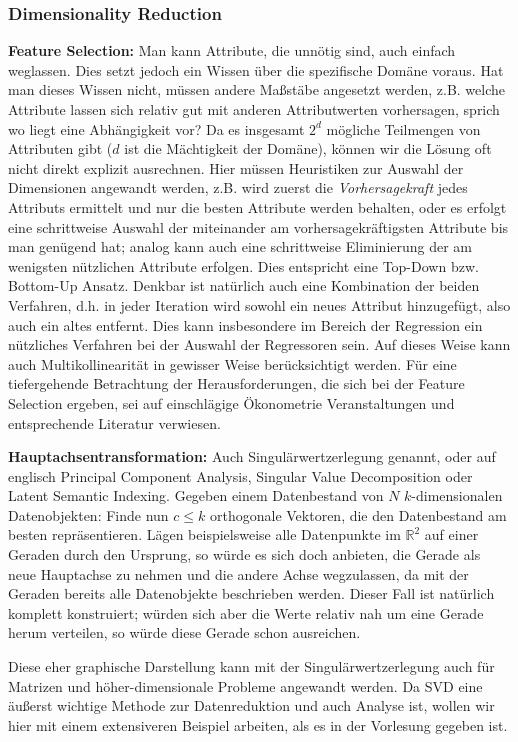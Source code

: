 \subsubsection{Dimensionality Reduction}
\textbf{Feature Selection:} Man kann Attribute, die unnötig sind, auch einfach
weglassen. Dies setzt jedoch ein Wissen über die spezifische Domäne voraus. Hat
man dieses Wissen nicht, müssen andere Maßstäbe angesetzt werden, z.B. welche 
Attribute lassen sich relativ gut mit anderen Attributwerten vorhersagen,
sprich wo liegt eine Abhängigkeit vor? Da es insgesamt \(2^d\) mögliche
Teilmengen von Attributen gibt (\(d\) ist die Mächtigkeit der Domäne), 
können wir die Lösung oft nicht direkt explizit ausrechnen. Hier
müssen Heuristiken zur Auswahl der Dimensionen angewandt werden, z.B. wird zuerst die
\textit{Vorhersagekraft} jedes Attributs ermittelt und nur die besten Attribute
werden behalten, oder es erfolgt eine schrittweise Auswahl der miteinander am vorhersagekräftigsten
Attribute bis man genügend hat; analog kann auch eine schrittweise Eliminierung der am
wenigsten nützlichen Attribute erfolgen. Dies entspricht eine Top-Down bzw.
Bottom-Up Ansatz. Denkbar ist natürlich auch eine Kombination der beiden
Verfahren, d.h. in jeder Iteration wird sowohl ein neues Attribut hinzugefügt,
also auch ein altes entfernt. Dies kann insbesondere im Bereich der Regression
ein nützliches Verfahren bei der Auswahl der Regressoren sein. Auf dieses Weise
kann auch Multikollinearität in gewisser Weise berücksichtigt werden. Für eine
tiefergehende Betrachtung der Herausforderungen, die sich bei der Feature
Selection ergeben, sei auf einschlägige Ökonometrie Veranstaltungen und
entsprechende Literatur verwiesen.

\textbf{Hauptachsentransformation:} Auch Singulärwertzerlegung genannt, oder auf 
englisch Principal Component Analysis, Singular Value Decomposition oder Latent 
Semantic Indexing. Gegeben einem Datenbestand von \(N\) \(k\)-dimensionalen 
Datenobjekten: Finde nun \(c\leq k\) orthogonale Vektoren, die den Datenbestand
am besten repräsentieren. Lägen beispielsweise alle Datenpunkte im \(\mathbb{R}^2\)
auf einer Geraden durch den Ursprung, so würde es sich doch anbieten, die Gerade
als neue Hauptachse zu nehmen und die andere Achse wegzulassen, da mit der Geraden
bereits alle Datenobjekte beschrieben werden. Dieser Fall ist natürlich komplett
konstruiert; würden sich aber die Werte relativ nah um eine Gerade herum verteilen,
so würde diese Gerade schon ausreichen.

Diese eher graphische Darstellung kann mit der Singulärwertzerlegung auch für
Matrizen und höher-dimensionale Probleme angewandt werden. Da SVD eine äußerst
wichtige Methode zur Datenreduktion und auch Analyse ist, wollen wir hier mit 
einem extensiveren Beispiel arbeiten, als es in der Vorlesung gegeben ist.


